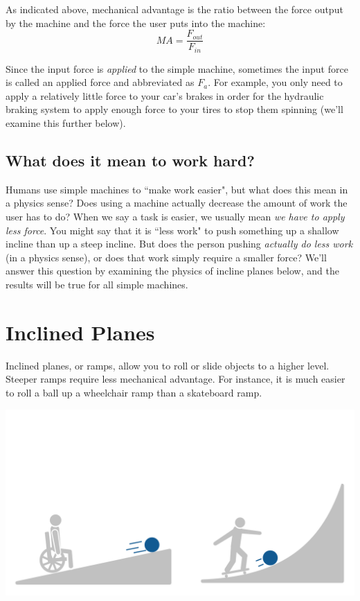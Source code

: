 As indicated above, mechanical advantage is the ratio between the force output 
by the machine and the force the user puts into the machine:
$$ MA = \frac{F_{out}}{F_{in}}$$

Since the input force is \textit{applied} to the simple machine, sometimes the 
input force is called an applied force and abbreviated as $F_a$. For example, 
you only need to apply a relatively little force to your car's brakes in order 
for the hydraulic braking system to apply enough force to your tires to stop 
them spinning (we'll examine this further below). 

\subsection{What does it mean to work hard?}
Humans use simple machines to ``make work easier", but what does this mean in a 
physics sense? Does using a machine actually decrease the amount of work the 
user has to do? When we say a task is easier, we usually mean \textit{we have to 
apply less force}. You might say that it is ``less work" to push something up a 
shallow incline than up a steep incline. But does the person pushing \textit{
actually do less work} (in a physics sense), or does that work simply require 
a smaller force? We'll answer this question by examining the physics of incline 
planes below, and the results will be true for all simple machines. 

\section{Inclined Planes}

Inclined planes, or ramps, allow you to roll or slide objects to a higher 
level. Steeper ramps require less mechanical advantage. For instance, it is much 
easier to roll a ball up a wheelchair ramp than a skateboard ramp.

\includegraphics[width=\textwidth]{rampcomparison.png}

